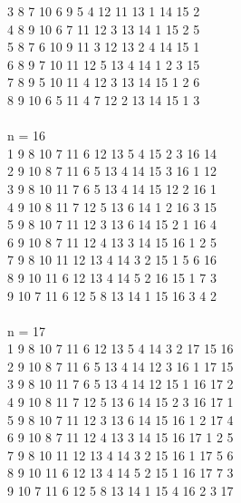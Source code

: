 {3 8 7 10 6 9 5 4 12 11 13 1 14 15 2\\
4 8 9 10 6 7 11 12 3 13 14 1 15 2 5\\
5 8 7 6 10 9 11 3 12 13 2 4 14 15 1\\
6 8 9 7 10 11 12 5 13 4 14 1 2 3 15 \\
7 8 9 5 10 11 4 12 3 13 14 15 1 2 6\\
8 9 10 6 5 11 4 7 12 2 13 14 15 1 3\\
\\
n = 16\\
1 9 8 10 7 11 6 12 13 5 4 15 2 3 16 14\\
2 9 10 8 7 11 6 5 13 4 14 15 3 16 1 12\\
3 9 8 10 11 7 6 5 13 4 14 15 12 2 16 1\\
4 9 10 8 11 7 12 5 13 6 14 1 2 16 3 15\\
5 9 8 10 7 11 12 3 13 6 14 15 2 1 16 4\\
6 9 10 8 7 11 12 4 13 3 14 15 16 1 2 5\\
7 9 8 10 11 12 13 4 14 3 2 15 1 5 6 16 \\
8 9 10 11 6 12 13 4 14 5 2 16 15 1 7 3\\
9 10 7 11 6 12 5 8 13 14 1 15 16 3 4 2\\
\\
n = 17\\
1 9 8 10 7 11 6 12 13 5 4 14 3 2 17 15 16 \\
2 9 10 8 7 11 6 5 13 4 14 12 3 16 1 17 15 \\
3 9 8 10 11 7 6 5 13 4 14 12 15 1 16 17 2 \\
4 9 10 8 11 7 12 5 13 6 14 15 2 3 16 17 1 \\
5 9 8 10 7 11 12 3 13 6 14 15 16 1 2 17 4 \\
6 9 10 8 7 11 12 4 13 3 14 15 16 17 1 2 5 \\
7 9 8 10 11 12 13 4 14 3 2 15 16 1 17 5 6 \\
8 9 10 11 6 12 13 4 14 5 2 15 1 16 17 7 3 \\
9 10 7 11 6 12 5 8 13 14 1 15 4 16 2 3 17 \\
}
